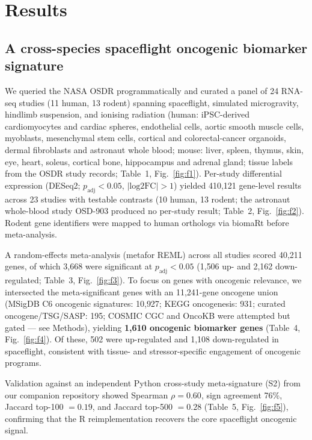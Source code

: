 \documentclass[pdflatex,sn-nature]{sn-jnl}
\begin{document}
\section{Results}\label{sec:results}

\subsection{A cross-species spaceflight oncogenic biomarker signature}

We queried the NASA OSDR programmatically and curated a panel of 24 RNA-seq studies
(11 human, 13 rodent) spanning spaceflight, simulated microgravity, hindlimb
suspension, and ionising radiation (human: iPSC-derived cardiomyocytes and cardiac
spheres, endothelial cells, aortic smooth muscle cells, myoblasts, mesenchymal stem
cells, cortical and colorectal-cancer organoids, dermal fibroblasts and astronaut
whole blood; mouse: liver, spleen, thymus, skin, eye, heart, soleus, cortical bone,
hippocampus and adrenal gland; tissue labels from the OSDR study records; Table~1,
Fig.~\ref{fig:f1}).
Per-study differential expression (DESeq2; \(p_{\mathrm{adj}} < 0.05\),
\(|\text{log2FC}| > 1\)) yielded 410{,}121 gene-level results across 23 studies with
testable contrasts (10 human, 13 rodent; the astronaut whole-blood study OSD-903
produced no per-study result; Table~2, Fig.~\ref{fig:f2}). Rodent gene identifiers were
mapped to human orthologs via biomaRt before meta-analysis.

A random-effects meta-analysis (metafor REML) across all studies scored 40{,}211
genes, of which 3{,}668 were significant at \(p_{\mathrm{adj}} < 0.05\) (1{,}506
up- and 2{,}162 down-regulated; Table~3, Fig.~\ref{fig:f3}). To focus on genes with
oncogenic relevance, we intersected the meta-significant genes with an
11{,}241-gene oncogene union (MSigDB C6 oncogenic signatures: 10{,}927; KEGG
oncogenesis: 931; curated oncogene/TSG/SASP: 195; COSMIC CGC and OncoKB were
attempted but gated --- see Methods), yielding \textbf{1{,}610 oncogenic biomarker
genes} (Table~4, Fig.~\ref{fig:f4}). Of these, 502 were up-regulated and 1{,}108
down-regulated in spaceflight, consistent with tissue- and stressor-specific
engagement of oncogenic programs.

Validation against an independent Python cross-study meta-signature (S2) from our
companion repository showed Spearman \(\rho = 0.60\), sign agreement 76\%, Jaccard
top-100 \(= 0.19\), and Jaccard top-500 \(= 0.28\) (Table~5, Fig.~\ref{fig:f5}),
confirming that the R reimplementation recovers the core spaceflight oncogenic
signal.
\end{document}
